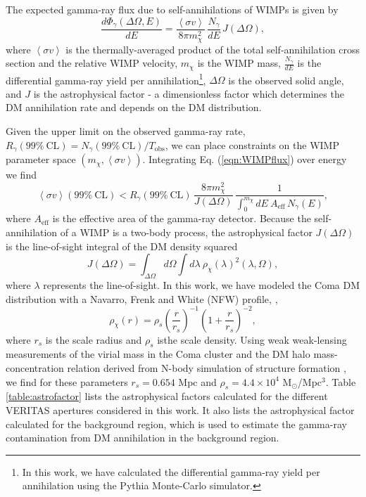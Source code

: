 \documentclass[12pt,manuscript]{aastex}
\newcommand{\expval}[1]{\left\langle #1 \right\rangle}
\begin{document}
The expected gamma-ray flux due to self-annihilations of WIMPs is given by
\begin{equation}
\frac{d\Phi_{\gamma}(\Delta\Omega,E)}{dE}=
\frac{\expval{\sigma v}}{8\pi m_{\chi}^{2}}\,\frac{N_{\gamma}}{dE}\, J(\Delta\Omega),
\label{eqn:WIMPflux}
\end{equation}
where $\expval{\sigma v}$ is the thermally-averaged product of the total self-annihilation cross
section and the relative WIMP velocity, $m_{\chi}$ is the WIMP mass, $\frac{N_{\gamma}}{dE}$ is the
differential gamma-ray yield per annihilation\footnote{In this work, we have calculated the
differential gamma-ray yield per annihilation using the Pythia Monte-Carlo simulator.},
$\Delta\Omega$ is the observed solid angle, and $J$ is the astrophysical factor - a dimensionless
factor which determines the DM annihilation rate and depends on the DM distribution.

Given the upper limit on the observed gamma-ray rate,
$R_{\gamma}(99\%\ \mathrm{CL}) = N_{\gamma}(99\%\ \mathrm{CL}) / T_{\mathrm{obs}}$, we can place
constraints on the WIMP parameter space $(m_{\chi}, \expval{\sigma v})$. Integrating Eq.
(\ref{eqn:WIMPflux}) over energy we find
\begin{equation}
\expval{\sigma v}(99\%\ \mathrm{CL}) <
R_{\gamma}(99\%\ \mathrm{CL})\, \frac{8\pi m_{\chi}^{2}}{J(\Delta\Omega)}\,
\frac{1}{\int^{m_{\chi}}_{0} dE\ A_{\mathrm{eff}}\,N_\gamma (E)},
\end{equation}
where $A_{\mathrm{eff}}$ is the effective area of the gamma-ray detector.
Because the self-annihilation of a WIMP is a two-body process, the astrophysical factor
$J(\Delta\Omega)$ is the line-of-sight integral of the DM density squared
\begin{equation}
J(\Delta\Omega)=\int_{\Delta\Omega}d\Omega\int d\lambda\ \rho_{\chi}(\lambda)^{2}(\lambda,\Omega),
\end{equation}
where $\lambda$ represents the line-of-sight. In this work, we have modeled the Coma DM
distribution with a Navarro, Frenk and White (NFW) profile,
\citet{article:NavarroFrenkWhite:1997},
\begin{equation}
\rho_{\chi}(r)=\rho_{s}\left(\frac{r}{r_{s}}\right)^{-1}\left(1+\frac{r}{r_{s}}\right)^{-2},
\end{equation}
where $r_{s}$ is the scale radius and $\rho_{s}$ isthe scale density. Using weak weak-lensing
measurements of the virial mass in the Coma cluster \citep{article:Gavazzi_etal:2009} and the DM
halo mass-concentration relation derived from N-body simulation of structure formation 
\citep{article:Bullock_etal:2001}, we find for these parameters $r_{s}=0.654$ Mpc and
$\rho_{s}=4.4\times 10^{4}$ M$_{\odot}$/Mpc$^{3}$. Table \ref{table:astrofactor} lists the
astrophysical factors calculated for the different VERITAS apertures considered in this work.
It also lists the astrophysical factor calculated for the background region, which is used
to estimate the gamma-ray contamination from DM annihilation in the background region.
\end{document}
